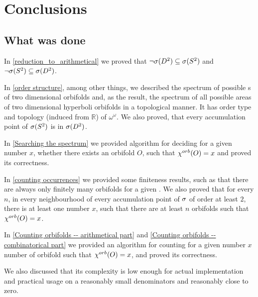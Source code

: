 \chapter{Conclusions}

\section{What was done}
In \ref{reduction_to_arithmetical} we proved that $\neg {{\sigma}(D^2)} \subseteq {{\sigma}(S^2)}$ and 
$\neg {{\sigma}(S^2)} \subseteq {{\sigma}(D^2)}$. 

In \ref{order structure}, among other things, we described the spectrum of possible \Eoc s 
of two dimensional orbifolds
and, as the result, the spectrum of all possible areas 
of two dimensional hyperboli orbifolds in a topological manner. 
It has order type and topology (induced from $\mathbb{R}$) of $\omega^\omega$. 
We also proved, that every accumulation point of ${{\sigma}(S^2)}$ is in ${{\sigma}(D^2)}$.

In \ref{Searching the spectrum} 
we provided algorithm for deciding for a given number $x$, whether 
there exists an orbifold $O$, such that ${\chi^{orb}(O)} = x$ and proved its correctness.

In \ref{counting occurrences} we provided some finiteness results, such as that 
there are always only finitely many 
orbifolds for a given \Eoc. 
We also proved that for every $n$, in every neighbourhood of every accumulation point 
of ${\sigma}$ of order at least $2$, there is at least one number $x$, such that there are at least 
$n$ orbifolds such that ${\chi^{orb}(O)} = x$.

In \ref{Counting orbifolds -- arithmetical part} 
and \ref{Counting orbifolds -- combinatorical part} 
we provided an algorithm 
 for counting for a given number $x$ number of orbifold such that ${\chi^{orb}(O)} = x$,
and proved its correctness. 
 
We also discussed that its complexity is low enough for actual implementation 
and practical usage on a reasonably small denominators and reasonably close to zero.



